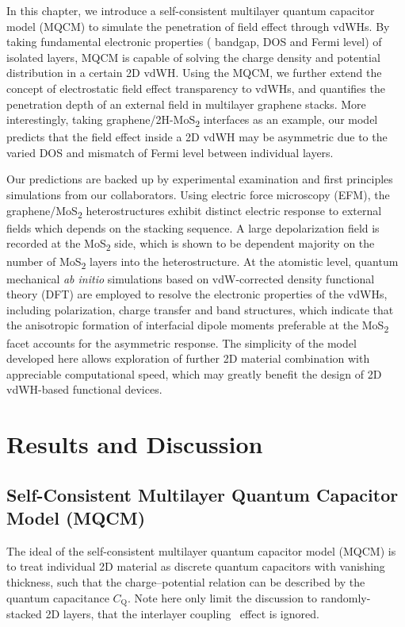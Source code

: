 In this chapter, we introduce a self-consistent multilayer quantum
capacitor model (MQCM) to simulate the penetration of field effect
through vdWHs. By taking fundamental electronic properties (\eg
bandgap, DOS and Fermi level) of isolated layers, MQCM is capable of
solving the charge density and potential distribution in a certain 2D
vdWH.
%
Using the MQCM, we further extend the concept of electrostatic field
effect transparency to vdWHs, and quantifies the penetration depth of
an external field in multilayer graphene stacks.
%
More interestingly, taking graphene/2H-MoS\textsubscript{2} interfaces
as an example, our model predicts that the field effect inside a 2D
vdWH may be asymmetric due to the varied DOS and mismatch of
Fermi level between individual layers.
%

Our predictions are backed up by experimental examination and first
principles simulations from our collaborators.
%
Using electric force microscopy (EFM), the
graphene/MoS\textsubscript{2} heterostructures exhibit distinct
electric response to external fields which depends on the stacking
sequence.
%
A large depolarization field is recorded at the
MoS\textsubscript{2} side, which is shown to be dependent majority
on the number of MoS\textsubscript{2} layers into the
heterostructure.
%
At the atomistic level, quantum mechanical \textit{ab initio}
simulations based on vdW-corrected density functional theory (DFT) are
employed to resolve the electronic properties of the vdWHs, including
polarization, charge transfer and band structures,
%
which indicate that
the anisotropic formation of interfacial dipole moments preferable at
the MoS\textsubscript{2} facet accounts for the asymmetric
response.
%
The simplicity of the model developed here allows exploration of
further 2D material combination with appreciable computational speed,
which may greatly benefit the design of 2D vdWH-based functional
devices.

\section{Results and Discussion}
\label{sec:asym-results}


\subsection{Self-Consistent Multilayer Quantum Capacitor Model (MQCM)}
\label{sec:asym-model}

The ideal of the self-consistent multilayer quantum capacitor model
(MQCM) is to treat individual 2D material as discrete quantum
capacitors with vanishing thickness, such that the charge--potential
relation can be described by the quantum capacitance $C_{\mathrm{Q}}$.
%
Note here only limit the discussion to randomly-stacked 2D layers,
that the interlayer coupling~\autocite{Fang_2014_intercoupl_vdW} effect is
ignored.

